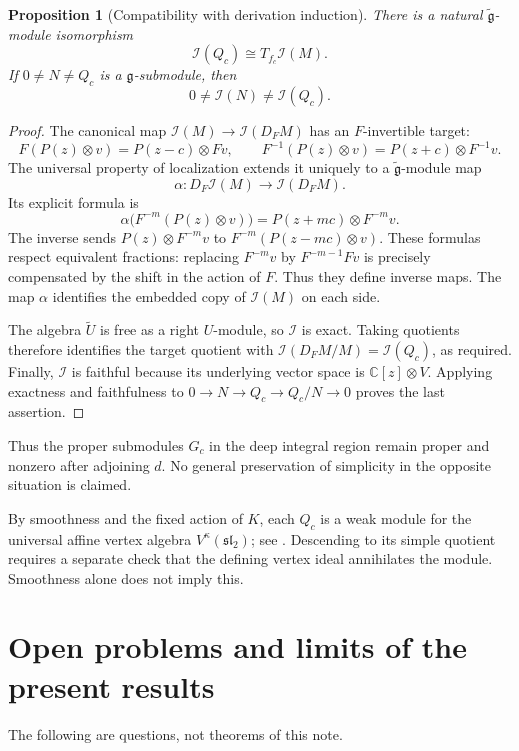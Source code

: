 \documentclass[11pt,a4paper]{article}
\newcommand{\C}{\mathbb C}
\newcommand{\g}{\mathfrak g}
\newcommand{\slc}{\mathfrak{sl}_2}
\newcommand{\I}{\mathcal I}
\theoremstyle{plainupright}
\newtheorem{proposition}{Proposition}[section]
\begin{document}
\begin{proposition}[Compatibility with derivation induction]\label{prop:d}
There is a natural \(\widetilde{\g}\)-module isomorphism
\[
\I(Q_c)\cong T_{f_c}\I(M).
\]
If \(0\ne N\ne Q_c\) is a \(\g\)-submodule, then
\[
0\ne\I(N)\ne\I(Q_c).
\]
\end{proposition}
\begin{proof}
The canonical map \(\I(M)\to\I(D_FM)\) has an \(F\)-invertible target:
\[
F(P(z)\otimes v)=P(z-c)\otimes Fv,\qquad
F^{-1}(P(z)\otimes v)=P(z+c)\otimes F^{-1}v.
\]
The universal property of localization extends it uniquely to a
\(\widetilde{\g}\)-module map
\[
\alpha:D_F\I(M)\longrightarrow\I(D_FM).
\]
Its explicit formula is
\begin{equation}\label{eq:alpha}
\alpha\bigl(F^{-m}(P(z)\otimes v)\bigr)
=P(z+mc)\otimes F^{-m}v.
\end{equation}
The inverse sends
\(P(z)\otimes F^{-m}v\) to \(F^{-m}(P(z-mc)\otimes v)\).
These formulas respect equivalent fractions: replacing
\(F^{-m}v\) by \(F^{-m-1}Fv\) is precisely compensated by the
shift in the action of \(F\). Thus they define inverse maps.
The map \(\alpha\) identifies the embedded copy of \(\I(M)\)
on each side.

The algebra \(\widetilde U\) is free as a right \(U\)-module, so
\(\I\) is exact. Taking quotients therefore identifies the target
quotient with \(\I(D_FM/M)=\I(Q_c)\), as required.
Finally, \(\I\) is faithful because its underlying vector space is
\(\C[z]\otimes V\). Applying exactness and faithfulness to
\(0\to N\to Q_c\to Q_c/N\to0\) proves the last assertion.
\end{proof}

Thus the proper submodules \(G_c\) in the deep integral region remain
proper and nonzero after adjoining \(d\). No general preservation
of simplicity in the opposite situation is claimed.

By smoothness and the fixed action of \(K\), each \(Q_c\) is a weak
module for the universal affine vertex algebra \(V^\kappa(\slc)\);
see \cite[Section 2]{FGXZ}. Descending to its simple quotient
requires a separate check that the defining vertex ideal annihilates
the module. Smoothness alone does not imply this.

\section{Open problems and limits of the present results}

The following are questions, not theorems of this note.
\end{document}
